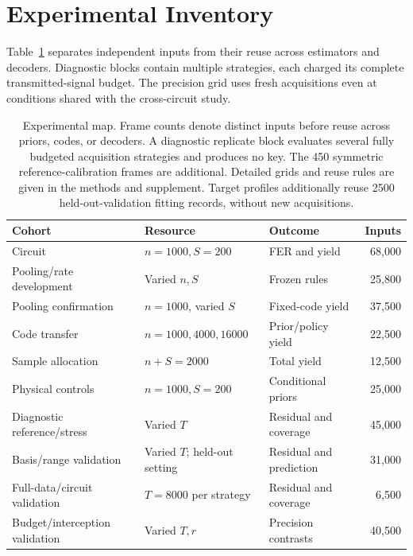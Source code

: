 \appendix
\section{Experimental Inventory}
\label{app:inventory}
Table~\ref{tab:cohorts} separates independent inputs from their reuse across
estimators and decoders. Diagnostic blocks contain multiple strategies, each
charged its complete transmitted-signal budget. The precision grid uses fresh
acquisitions even at conditions shared with the cross-circuit study.

\begin{table}[!htbp]
\centering
\small\setlength{\tabcolsep}{4pt}
\caption{Experimental map. Frame counts denote distinct inputs before reuse across priors, codes, or decoders. A diagnostic replicate block evaluates several fully budgeted acquisition strategies and produces no key. The 450 symmetric reference-calibration frames are additional. Detailed grids and reuse rules are given in the methods and supplement. Target profiles additionally reuse 2500 held-out-validation fitting records, without new acquisitions.}
\label{tab:cohorts}
\begin{tabular}{@{}lllr@{}}
\toprule
Cohort & Resource & Outcome & Inputs \\
\midrule
Circuit & $n=1000,S=200$ & FER and yield & 68,000 \\
Pooling/rate development & Varied $n,S$ & Frozen rules & 25,800 \\
Pooling confirmation & $n=1000$, varied $S$ & Fixed-code yield & 37,500 \\
Code transfer & $n=1000,4000,16000$ & Prior/policy yield & 22,500 \\
Sample allocation & $n+S=2000$ & Total yield & 12,500 \\
Physical controls & $n=1000,S=200$ & Conditional priors & 25,000 \\
Diagnostic reference/stress & Varied $T$ & Residual and coverage & 45,000 \\
Basis/range validation & Varied $T$; held-out setting & Residual and prediction & 31,000 \\
Full-data/circuit validation & $T=8000$ per strategy & Residual and coverage & 6,500 \\
Budget/interception validation & Varied $T,r$ & Precision contrasts & 40,500 \\
\bottomrule
\end{tabular}
\end{table}
\FloatBarrier

